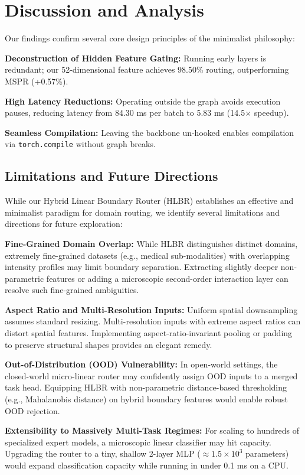 \documentclass{article}
\theoremstyle{plain}
\theoremstyle{definition}
\theoremstyle{remark}
\begin{document}
\section{Discussion and Analysis}
\label{sec:discuss}
Our findings confirm several core design principles of the minimalist philosophy:

\textbf{Deconstruction of Hidden Feature Gating:} Running early layers is redundant; our 52-dimensional feature achieves 98.50\% routing, outperforming MSPR (+0.57\%).

\textbf{High Latency Reductions:} Operating outside the graph avoids execution pauses, reducing latency from 84.30 ms per batch to 5.83 ms (14.5$\times$ speedup).

\textbf{Seamless Compilation:} Leaving the backbone un-hooked enables compilation via \texttt{torch.compile} without graph breaks.

\subsection{Limitations and Future Directions}
While our Hybrid Linear Boundary Router (HLBR) establishes an effective and minimalist paradigm for domain routing, we identify several limitations and directions for future exploration:

\textbf{Fine-Grained Domain Overlap:} While HLBR distinguishes distinct domains, extremely fine-grained datasets (e.g., medical sub-modalities) with overlapping intensity profiles may limit boundary separation. Extracting slightly deeper non-parametric features or adding a microscopic second-order interaction layer can resolve such fine-grained ambiguities.

\textbf{Aspect Ratio and Multi-Resolution Inputs:} Uniform spatial downsampling assumes standard resizing. Multi-resolution inputs with extreme aspect ratios can distort spatial features. Implementing aspect-ratio-invariant pooling or padding to preserve structural shapes provides an elegant remedy.

\textbf{Out-of-Distribution (OOD) Vulnerability:} In open-world settings, the closed-world micro-linear router may confidently assign OOD inputs to a merged task head. Equipping HLBR with non-parametric distance-based thresholding (e.g., Mahalanobis distance) on hybrid boundary features would enable robust OOD rejection.

\textbf{Extensibility to Massively Multi-Task Regimes:} For scaling to hundreds of specialized expert models, a microscopic linear classifier may hit capacity. Upgrading the router to a tiny, shallow 2-layer MLP ($\approx 1.5\times 10^3$ parameters) would expand classification capacity while running in under 0.1 ms on a CPU.
\end{document}
